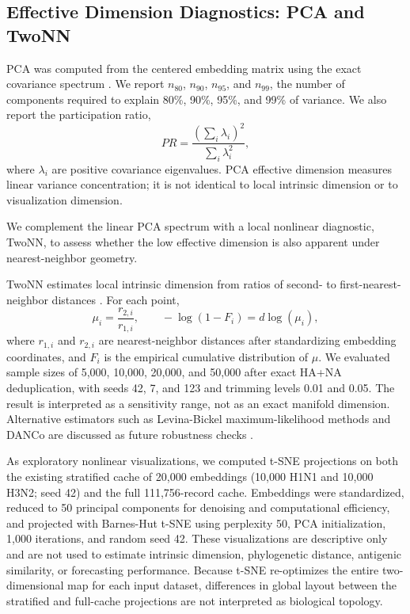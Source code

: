 \documentclass[11pt]{article}
\begin{document}
\subsection{Effective Dimension Diagnostics: PCA and TwoNN}

PCA was computed from the centered embedding matrix using the exact covariance spectrum \cite{jolliffe2002pca,jolliffe2016pca}. We report $n_{80}$, $n_{90}$, $n_{95}$, and $n_{99}$, the number of components required to explain 80\%, 90\%, 95\%, and 99\% of variance. We also report the participation ratio,
\[
PR=\frac{(\sum_i\lambda_i)^2}{\sum_i\lambda_i^2},
\]
where $\lambda_i$ are positive covariance eigenvalues. PCA effective dimension measures linear variance concentration; it is not identical to local intrinsic dimension or to visualization dimension.

We complement the linear PCA spectrum with a local nonlinear diagnostic, TwoNN, to assess whether the low effective dimension is also apparent under nearest-neighbor geometry.

TwoNN estimates local intrinsic dimension from ratios of second- to first-nearest-neighbor distances \cite{facco2017intrinsic}. For each point,
\[
\mu_i=\frac{r_{2,i}}{r_{1,i}},
\qquad
-\log(1-F_i)=d\log(\mu_i),
\]
where $r_{1,i}$ and $r_{2,i}$ are nearest-neighbor distances after standardizing embedding coordinates, and $F_i$ is the empirical cumulative distribution of $\mu$. We evaluated sample sizes of 5,000, 10,000, 20,000, and 50,000 after exact HA+NA deduplication, with seeds 42, 7, and 123 and trimming levels 0.01 and 0.05. The result is interpreted as a sensitivity range, not as an exact manifold dimension. Alternative estimators such as Levina-Bickel maximum-likelihood methods and DANCo are discussed as future robustness checks \cite{levina2005maximum,ceruti2014danco}.

As exploratory nonlinear visualizations, we computed t-SNE projections on both the existing stratified cache of 20,000 embeddings (10,000 H1N1 and 10,000 H3N2; seed 42) and the full 111,756-record cache. Embeddings were standardized, reduced to 50 principal components for denoising and computational efficiency, and projected with Barnes-Hut t-SNE using perplexity 50, PCA initialization, 1,000 iterations, and random seed 42. These visualizations are descriptive only and are not used to estimate intrinsic dimension, phylogenetic distance, antigenic similarity, or forecasting performance. Because t-SNE re-optimizes the entire two-dimensional map for each input dataset, differences in global layout between the stratified and full-cache projections are not interpreted as biological topology.
\end{document}
